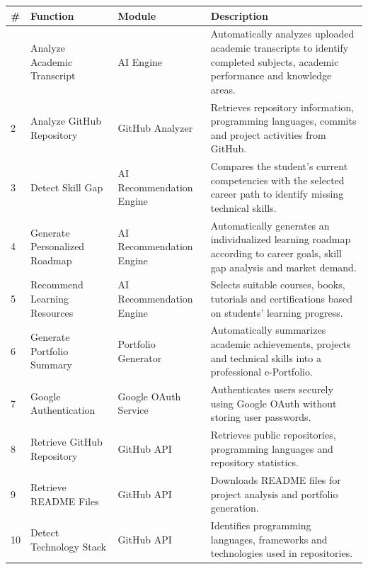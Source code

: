 \begin{longtable}{|>{\centering\arraybackslash}p{0.8cm}|p{3.8cm}|p{3.8cm}|p{7.8cm}|}
\hline
\rowcolor[HTML]{F4D7D7}
\textbf{\#} &
\textbf{Function} &
\textbf{Module} &
\textbf{Description}
\\
\hline
\endfirsthead

\hline
\endhead

1 &
Analyze Academic Transcript &
AI Engine &
Automatically analyzes uploaded academic transcripts to identify completed subjects, academic performance and knowledge areas.
\\
\hline

2 &
Analyze GitHub Repository &
GitHub Analyzer &
Retrieves repository information, programming languages, commits and project activities from GitHub.
\\
\hline

3 &
Detect Skill Gap &
AI Recommendation Engine &
Compares the student's current competencies with the selected career path to identify missing technical skills.
\\
\hline

4 &
Generate Personalized Roadmap &
AI Recommendation Engine &
Automatically generates an individualized learning roadmap according to career goals, skill gap analysis and market demand.
\\
\hline

5 &
Recommend Learning Resources &
AI Recommendation Engine &
Selects suitable courses, books, tutorials and certifications based on students' learning progress.
\\
\hline

6 &
Generate Portfolio Summary &
Portfolio Generator &
Automatically summarizes academic achievements, projects and technical skills into a professional e-Portfolio.
\\
\hline

7 &
Google Authentication &
Google OAuth Service &
Authenticates users securely using Google OAuth without storing user passwords.
\\
\hline

8 &
Retrieve GitHub Repository &
GitHub API &
Retrieves public repositories, programming languages and repository statistics.
\\
\hline

9 &
Retrieve README Files &
GitHub API &
Downloads README files for project analysis and portfolio generation.
\\
\hline

10 &
Detect Technology Stack &
GitHub API &
Identifies programming languages, frameworks and technologies used in repositories.
\\
\hline


\end{longtable}
